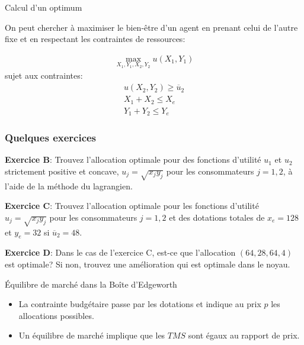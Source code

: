 \documentclass[handout]{beamer}
\begin{document}
\begin{frame}{Calcul d'un optimum}

On peut chercher à maximiser le bien-être d'un agent en prenant celui de l'autre fixe et en respectant les contraintes de ressources: 

\begin{eqnarray*}
\max_{X_1,Y_1,X_2,Y_2} u(X_1,Y_1) 
\end{eqnarray*}
sujet aux contraintes:
\begin{eqnarray*}
u(X_2,Y_2)\ge \overline{u}_2 \\
X_1 + X_2 \le X_e \\
Y_1 + Y_2 \le Y_e
\end{eqnarray*}

\end{frame}

\begin{frame}\frametitle{Quelques exercices} 


\textbf{Exercice B}: Trouvez l'allocation optimale pour des fonctions d'utilité $u_1$ et $u_2$ strictement positive et concave, $u_j = \sqrt{x_j y_j}$ pour les consommateurs $j=1,2$, à l'aide de la méthode du lagrangien.

\textbf{Exercice C}: Trouvez l'allocation optimale pour les fonctions d'utilité $u_j = \sqrt{x_j y_j}$ pour les consommateurs $j=1,2$ et des dotations totales de $x_e = 128$ et $y_e=32$ si $\overline{u}_2=48$.

\textbf{Exercice D}: Dans le cas de l'exercice C, est-ce que l'allocation $(64,28,64,4)$ est optimale? Si non, trouvez une amélioration qui est optimale dans le noyau. 

\end{frame}

\begin{frame}{Équilibre de marché dans la Boîte d'Edgeworth}
\begin{itemize}
    \item La contrainte budgétaire passe par les dotations et indique au prix $p$ les allocations possibles. 
    \item Un équilibre de marché implique que les $TMS$ sont égaux au rapport de prix.
\end{itemize}
\end{frame}
\end{document}
